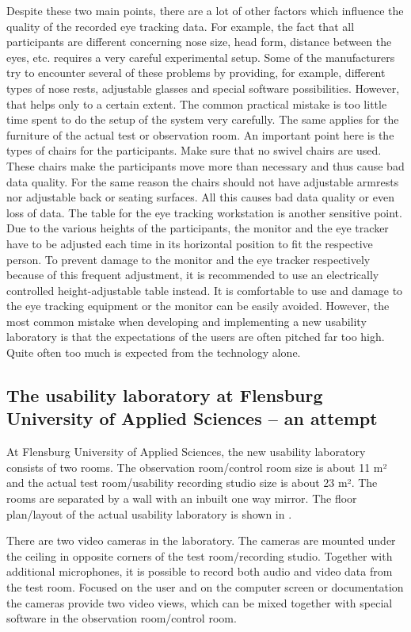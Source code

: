\documentclass[output=paper]{langsci/langscibook}
\begin{document}
Despite these two main points, there are a lot of other factors which influence the quality of the recorded eye tracking data. For example, the fact that all participants are different concerning nose size, head form, distance between the eyes, etc. requires a very careful experimental setup. Some of the manufacturers try to encounter several of these problems by providing, for example, different types of nose rests, adjustable glasses and special software possibilities. However, that helps only to a certain extent. The common practical mistake is too little time spent to do the setup of the system very carefully. The same applies for the furniture of the actual test or observation room. An important point here is the types of chairs for the participants. Make sure that no swivel chairs are used. These chairs make the participants move more than necessary and thus cause bad data quality. For the same reason the chairs should not have adjustable armrests nor adjustable back or seating surfaces. All this causes bad data quality or even loss of data. The table for the eye tracking workstation is another sensitive point. Due to the various heights of the participants, the monitor and the eye tracker have to be adjusted each time in its horizontal position to fit the respective person. To prevent damage to the monitor and the eye tracker respectively because of this frequent adjustment, it is recommended to use an electrically controlled height-adjustable table instead. It is comfortable to use and damage to the eye tracking equipment or the monitor can be easily avoided. However, the most common mistake when developing and implementing a new usability laboratory is that the expectations of the users are often pitched far too high. Quite often too much is expected from the technology alone. 


\subsection{The usability laboratory at Flensburg University of Applied Sciences -- an attempt }

At Flensburg University of Applied Sciences, the new usability laboratory consists of two rooms. The observation room/control room size is about 11 m² and the actual test room/usability recording studio size is about 23 m². The rooms are separated by a wall with an inbuilt one way mirror. The floor plan/layout of the actual usability laboratory is shown in . 


There are two video cameras in the laboratory. The cameras are mounted under the ceiling in opposite corners of the test room/recording studio. Together with additional microphones, it is possible to record both audio and video data from the test room. Focused on the user and on the computer screen or documentation the cameras provide two video views, which can be mixed together with special software in the observation room/control room. 
\end{document}
